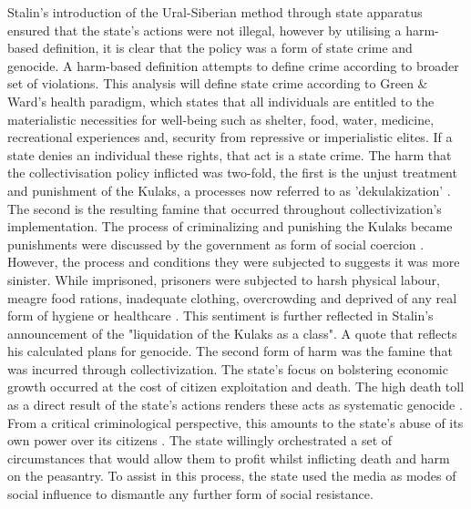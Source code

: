 \documentclass[12pt, a4paper,]{scrartcl}
\begin{document}
Stalin's introduction of the Ural-Siberian method through state apparatus ensured that the state's actions were not illegal, however by utilising a harm-based definition, it is clear that the policy was a form of state crime and genocide. A harm-based definition attempts to define crime according to broader set of violations. This analysis will define state crime according to Green \& Ward's \citeyear{Green2000} health paradigm, which states that all individuals are entitled to the materialistic necessities for well-being such as shelter, food, water, medicine, recreational experiences and, security from repressive or imperialistic elites. If a state denies an individual these rights, that act is a state crime. The harm that the collectivisation policy inflicted was two-fold, the first is the unjust treatment and punishment of the Kulaks, a processes now referred to as 'dekulakization' \cite{Meierhenrich}. The second is the resulting famine that occurred throughout collectivization's implementation. The process of criminalizing and punishing the Kulaks became punishments were discussed by the government as form of social coercion \cite{Viola2005}. However, the process and conditions they were subjected to suggests it was more sinister. While imprisoned, prisoners were subjected to harsh physical labour, meagre food rations, inadequate clothing, overcrowding and deprived of any real form of hygiene or healthcare \cite{Khlevniuk2004}. This sentiment is further reflected in Stalin's announcement of the "liquidation of the Kulaks as a class". A quote that reflects his calculated plans for genocide. The second form of harm was the famine that was incurred through collectivization. The state's focus on bolstering economic growth occurred at the cost of citizen exploitation and death. The high death toll as a direct result of the state's actions renders these acts as systematic genocide \cite{Meierhenrich}. From a critical criminological perspective, this amounts to the state's abuse of its own power over its citizens \cite{Pontell2005UnmaskingCorporations}. The state willingly orchestrated a set of circumstances that would allow them to profit whilst inflicting death and harm on the peasantry. To assist in this process, the state used the media as modes of social influence to dismantle any further form of social resistance.\par
\end{document}
